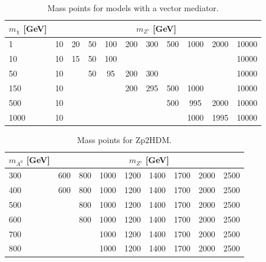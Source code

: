 \begin{table}[htbH]
\begin{center}
\begin{tabular}{ l | c | c | c | c | c | c | c | c | c | c}
\hline
$m_\chi$ [GeV] & \multicolumn{10}{|c}{$m_{Z'}$ [GeV]} \\
\hline
1 & 10 & 20 & 50 & 100 & 200 & 300 & 500 & 1000 & 2000 & 10000 \\
10 & 10 & 15 & 50 & 100 & & & & & & 10000 \\
50 & 10 & & 50 & 95  & 200 & 300 & & & & 10000 \\
150 & 10 & & & & 200 & 295 & 500 & 1000 & & 10000 \\
500 & 10 & & & & & & 500 & 995 & 2000 & 10000 \\
1000 & 10 & & & & & & & 1000 & 1995 & 10000 \\
\hline
\end{tabular}
\caption{Mass points for models with a vector mediator.}\label{tab:MMVector}
\end{center}
\end{table}

\begin{table}[htbH] 
\begin{center} 
\begin{tabular}{ l | c | c | c | c | c | c | c | c} 
\hline 
$m_{A^0}$ [GeV] & \multicolumn{8}{|c}{$m_{Z'}$ [GeV]} \\ 
\hline 
300 & 600 & 800 & 1000 & 1200 & 1400 & 1700 & 2000 & 2500 \\ 
400 & 600 & 800 & 1000 & 1200 & 1400 & 1700 & 2000 & 2500 \\ 
500 & & 800 & 1000 & 1200 & 1400 & 1700 & 2000 & 2500 \\ 
600 & & 800 & 1000 & 1200 & 1400 & 1700 & 2000 & 2500 \\
700 & & & 1000 & 1200 & 1400 & 1700 & 2000 & 2500 \\ 
800 & & & 1000 & 1200 & 1400 & 1700 & 2000 & 2500 \\ 
\hline
\end{tabular} 
\caption{Mass points for Zp2HDM.}\label{tab:MM2HDM} 
\end{center} 
\end{table} 

